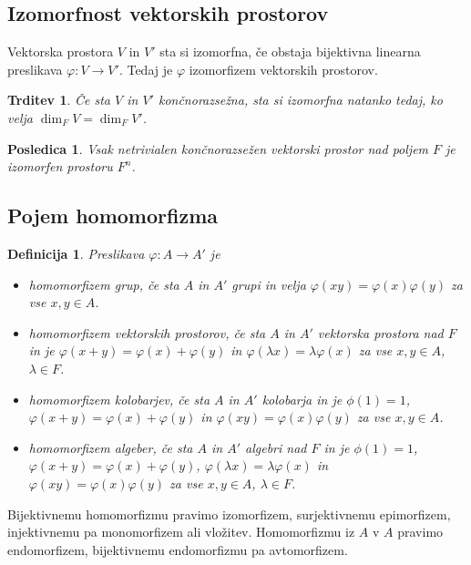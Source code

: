 \documentclass[10pt, a4paper]{article}
\newtheorem{posledica}[izr]{Posledica}
\newtheorem{trditev}[izr]{Trditev}
\newtheorem{defi}{Definicija}[section]
\newenvironment{noticeB}{%
  \tcolorbox[%
  notitle,
  empty,
  enhanced,  %
  breakable,
  coltext=black,
  colback=white, 
  fontupper=\rmfamily,
  noparskip,
  sharp corners,
  boxrule=-1pt,  %
  frame hidden,
  left=7pt,  %
  right=7pt,
  top=5pt,
  bottom=5pt,
  before skip=2.5ex plus 2pt,
  after skip=2.5ex plus 2pt,
  borderline west = {1.5pt}{-0.1pt}{blue!30!black}, %
  overlay unbroken and last={%
    \draw[color=black, line width=1.25pt]
    ($(frame.south west)+(1.pt, -0.1pt)$) -- ++(2em, 0);
  }
  ]}
{\endtcolorbox}
\newenvironment{definicija}{\begin{noticeB}\begin{defi}}{%
    \end{defi}\end{noticeB}}
\begin{document}
\subsection{Izomorfnost vektorskih prostorov}

Vektorska prostora $V$ in $V'$ sta si izomorfna, če obstaja bijektivna linearna preslikava
$\varphi: V \to V'$. Tedaj je $\varphi$ izomorfizem vektorskih prostorov.

\begin{trditev}
  Če sta $V$ in $V'$ končnorazsežna, sta si izomorfna natanko tedaj, ko velja $\dim_F V = \dim_F V'$.
\end{trditev}

\begin{posledica}
  Vsak netrivialen končnorazsežen vektorski prostor nad poljem $F$ je izomorfen prostoru $F^n$.
\end{posledica}

\subsection{Pojem homomorfizma}

\begin{definicija}
  Preslikava $\varphi: A \to A'$ je 
  \begin{itemize}
    \item homomorfizem grup, če sta $A$ in $A'$ grupi in velja $\varphi(xy) = \varphi(x) \varphi(y)$ za vse $x, y \in A$.
    \item homomorfizem vektorskih prostorov, če sta $A$ in $A'$ vektorska prostora nad $F$ in je $\varphi (x + y) = \varphi(x) + \varphi(y)$ 
    in $\varphi(\lambda x) = \lambda \varphi(x)$ za vse $x,y \in A$, $\lambda \in F$.
    \item homomorfizem kolobarjev, če sta $A$ in $A'$ kolobarja in je $\phi(1) = 1$, $\varphi (x + y) = \varphi(x) + \varphi(y)$ 
    in $\varphi(xy) = \varphi(x) \varphi(y)$ za vse $x,y \in A$.
    \item homomorfizem algeber, če sta $A$ in $A'$ algebri nad $F$ in je $\phi(1) = 1$, $\varphi (x + y) = \varphi(x) + \varphi(y)$, $\varphi(\lambda x) = \lambda \varphi(x)$ 
    in $\varphi(xy) = \varphi(x) \varphi(y)$ za vse $x,y \in A$, $\lambda \in F$.
  \end{itemize}
\end{definicija}

Bijektivnemu homomorfizmu pravimo izomorfizem, surjektivnemu epimorfizem, 
injektivnemu pa monomorfizem ali vložitev.
Homomorfizmu iz $A$ v $A$ pravimo endomorfizem, bijektivnemu endomorfizmu pa avtomorfizem.
\end{document}
